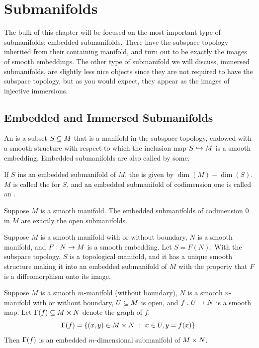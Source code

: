 \newpage\setcounter{section}{4}
\section{Submanifolds}

The bulk of this chapter will be focused on the most important type of submanifolds: embedded submanifolds. There have the subspace topology inherited from their containing manifold, and turn out to be exactly the images of smooth embeddings. The other type of submanifold we will discuss, immersed submanifolds, are slightly less nice objects since they are not required to have the subspace topology, but as you would expect, they appear as the images of injective immersions.

\subsection{Embedded and Immersed Submanifolds}\nl

\dfn An  is a subset $S\subseteq M$ that is a manifold in the subspace topology, endowed with a smooth structure with respect to which the inclusion map $S\hookrightarrow M$ is a smooth embedding. Embedded submanifolds are also called  by some.

\dfn If $S$ ins an embedded submanifold of $M$, the  is given by $\dim(M) - \dim(S)$. $M$ is called the  for $S$, and an embedded submanifold of codimension one is called an .

\begin{prop}
Suppose $M$ is a smooth manifold. The embedded submanifolds of codimension 0 in $M$ are exactly the open submanifolds.
\end{prop}

\begin{prop}
Suppose $M$ is a smooth manifold with or without boundary, $N$ is a smooth manifold, and $F:N\rightarrow M$ is a smooth embedding. Let $S = F(N)$. With the subspace topology, $S$ is a topological manifold, and it has a unique smooth structure making it into an embedded submanifold of $M$ with the property that $F$ is a diffeomorphism onto its image.
\end{prop}

\setcounter{thm}{3}

\begin{prop}
Suppose $M$ is a smooth $m$-manifold (without boundary), $N$ is a smooth $n$-manifold with or without boundary, $U\subseteq M$ is open, and $f:U\rightarrow N$ is a smooth map. Let $\Gamma(f)\subseteq M\times N$ denote the graph of $f$:
\[\Gamma(f) = \{(x,y)\in M\times N\ :\ x\in U, y = f(x)\}.\]
Then $\Gamma(f)$ is an embedded $m$-dimensional submanifold of $M\times N$.
\end{prop}

